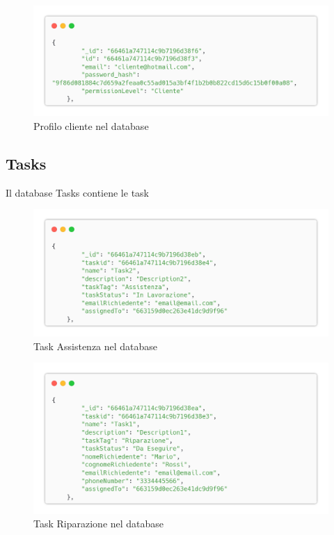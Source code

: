 \documentclass{report}
\begin{document}
\begin{figure}[H]
	\centering\includegraphics[width=1\textwidth]{images/database/cliente.png}
	\caption{Profilo cliente nel database}
\end{figure}


\subsection*{Tasks}
Il database Tasks contiene le task
\begin{figure}[H]
	\centering\includegraphics[width=1\textwidth]{images/database/assistenza.png}
	\caption{Task Assistenza nel database}
\end{figure}
\begin{figure}[H]
	\centering\includegraphics[width=1\textwidth]{images/database/riparazione.png}
	\caption{Task Riparazione nel database}
\end{figure}
\end{document}
